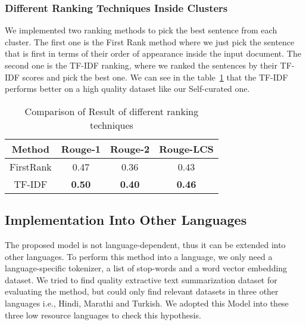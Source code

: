 \subsubsection{Different Ranking Techniques Inside Clusters}\label{subsubsec:different-ranking-techniques-inside-clusters}
We implemented two ranking methods to pick the best sentence from each cluster.
The first one is the First Rank method where we just pick the sentence that is first in terms of their order of
appearance inside the input document.
The second one is the TF-IDF ranking, where we ranked the sentences by their TF-IDF scores and pick the best one.
We can see in the table~\ref{tab:ranking} that the TF-IDF performs
better on a high quality dataset like our Self-curated one.\\

\begin{table}
    \centering
    \begin{tabular}{cccc}\hline
        Method      & Rouge-1       & Rouge-2       & Rouge-LCS     \\\hline
        FirstRank   & 0.47          & 0.36          & 0.43          \\
        TF-IDF      & \textbf{0.50} & \textbf{0.40} & \textbf{0.46} \\\hline
    \end{tabular}
    \caption{Comparison of Result of different ranking techniques}
    \label{tab:ranking}
\end{table}

\subsection{Implementation Into Other Languages}\label{subsec:implementation-into-other-languages}
The proposed model is not language-dependent, thus it can be extended into other languages.
To perform this method into a language, we only need a language-specific tokenizer, a list of stop-words and
a word vector embedding dataset.
We tried to find quality extractive text summarization dataset for evaluating the method, but could only
find relevant datasets in three other languages i.e., Hindi, Marathi and Turkish.
We adopted this Model into these three low resource languages to check this hypothesis.\\


